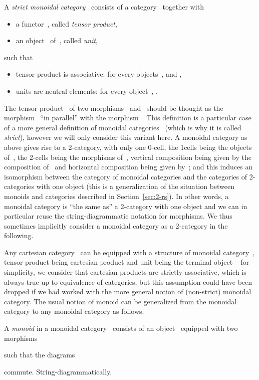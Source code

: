 \documentclass{LMCS}
\begin{document}
\begin{defi}
  \label{def:mon-cat}
  A \emph{strict monoidal category}~ consists of a category~
  together with
  \begin{itemize}
  \item a functor~, called \emph{tensor product},
  \item an object~ of~, called \emph{unit},
  \end{itemize}
  such that
  \begin{itemize}
  \item tensor product is associative: for every objects~, and ,
    
  \item units are neutral elements: for every object~, .
  \end{itemize}
\end{defi}

The tensor product~ of two morphisms~ and~ should be thought
as the morphism~ ``in parallel'' with the morphism~. This definition is a
particular case of a more general definition of monoidal
categories~\cite{maclane:cwm} (which is why it is called \emph{strict}), however
we will only consider this variant here. A monoidal category  as
above gives rise to a 2-category, with only one 0-cell, the 1\nbd{}cells being
the objects of~, the 2-cells being the morphisms of~, vertical
composition being given by the composition of~ and horizontal composition
being given by~; and this induces an isomorphism between the
category of monoidal categories and the categories of 2-categories with one
object (this is a generalization of the situation between monoids and categories
described in Section~\ref{sec:2-rs}). In other words, a monoidal category is
``the same as'' a 2-category with one object and we can in particular reuse the
string-diagrammatic notation for morphisms. We thus sometimes implicitly
consider a monoidal category as a 2-category in the following.

Any cartesian category~ can be equipped with a structure of monoidal
category~, tensor product being cartesian product and unit being
the terminal object -- for simplicity, we consider that cartesian products are
strictly associative, which is always true up to equivalence of categories, but
this assumption could have been dropped if we had worked with the more general
notion of (non-strict) monoidal category. The usual notion of monoid can be
generalized from the monoidal category  to any monoidal
category as follows.

\begin{defi}
  \label{def:monoid}
  A \emph{monoid}  in a monoidal category~
  consists of an object~ equipped with two morphisms
  
  such that the diagrams
  
  commute. String-diagrammatically,
  
\end{defi}
\end{document}
